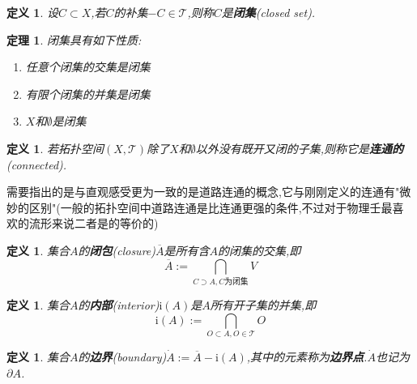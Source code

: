 \documentclass[UTF8]{article}
\newcommand{\im}{\mathrm{i}}
\begin{document}
	\newtheorem*{closedSet}{定义}
	
	\begin{closedSet}
		设$C \subset X$,若$C$的补集$-C \in \mathscr{T}$,则称$C$是\textbf{闭集}(closed set).
	\end{closedSet}
	
	\newtheorem*{closetSetProperty}{定理}
	
	\begin{closetSetProperty}
		
		闭集具有如下性质:
		
		\begin{enumerate}
			
			\item 任意个闭集的交集是闭集
			
			\item 有限个闭集的并集是闭集
			
			\item $X$和$\emptyset$是闭集
			
		\end{enumerate}
		
	\end{closetSetProperty}
	
	\newtheorem*{connected}{定义}
	
	\begin{connected}
		若拓扑空间$(X,\mathscr{T})$除了$X$和$\emptyset$以外没有既开又闭的子集,则称它是\textbf{连通的}(connected).
	\end{connected}
	
	需要指出的是与直观感受更为一致的是道路连通的概念,它与刚刚定义的连通有"微妙的区别"(一般的拓扑空间中道路连通是比连通更强的条件,不过对于物理壬最喜欢的流形来说二者是的等价的)
	
	\newtheorem*{closure}{定义}
	
	\begin{closure}
		集合$A$的\textbf{闭包}(closure)$\overline{A}$是所有含$A$的闭集的交集,即
		\[\overline{A} := \bigcap_{C \supset A, C\text{为闭集}} V\]
	\end{closure}
	
	\newtheorem*{interior}{定义}
	
	\begin{interior}
		集合$A$的\textbf{内部}(interior)$\im(A)$是$A$所有开子集的并集,即
		\[\im(A) := \bigcap_{O \subset A, O \in \mathscr{T}} O\]
	\end{interior}
	
	\newtheorem{boundary}{定义}
	
	\begin{boundary}
		集合$A$的\textbf{边界}(boundary)$\dot{A}:=\overline{A}-\im(A)$,其中的元素称为\textbf{边界点}.$\dot{A}$也记为$\partial A$.
	\end{boundary}
	
\end{document}

